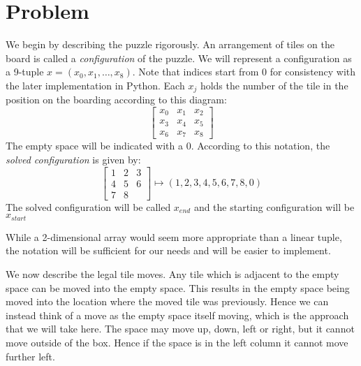 \documentclass[a4paper]{article}
\begin{document}
\section{Problem}\label{sec:problem}
We begin by describing the puzzle rigorously.  An arrangement of tiles on the board is called a \emph{configuration} of the puzzle.  We will represent a configuration as a 9-tuple $x = (x_0, x_1, \ldots , x_8)$.  Note that indices start from 0 for consistency with the later implementation in Python.  Each $x_j$ holds the number of the tile in the position on the boarding according to this diagram:
\[\left[
   \begin{array}{ccc}
      x_0 & x_1 & x_2 \\
      x_3 & x_4 & x_5 \\
      x_6 & x_7 & x_8
   \end{array}
   \right]
\]
The empty space will be indicated with a 0.  According to this notation, the \emph{solved configuration} is given by:
\[\left[
   \begin{array}{ccc}
      1 & 2 & 3 \\
      4 & 5 & 6 \\
      7 & 8
   \end{array}
   \right]  \mapsto (1,2,3,4,5,6,7,8,0)
\]
The solved configuration will be called $x_{end}$ and the starting configuration will be $x_{start}$

While a 2-dimensional array would seem more appropriate than a linear tuple, the notation will be sufficient for our needs and will be easier to implement.

We now describe the legal tile moves.  Any tile which is adjacent to the empty space can be moved into the empty space.  This results in the empty space being moved into the location where the moved tile was previously.  Hence we can instead think of a move as the empty space itself moving, which is the approach that we will take here.  The space may move up, down, left or right, but it cannot move outside of the box.  Hence if the space is in the left column it cannot move further left.
\end{document}
